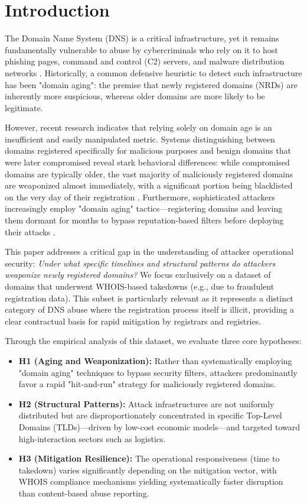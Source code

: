 \documentclass[final, 9pt, twocolumn]{saucis}
\begin{document}
\section{Introduction}

The Domain Name System (DNS) is a critical infrastructure, yet it remains fundamentally vulnerable to abuse by cybercriminals who rely on it to host phishing pages, command and control (C2) servers, and malware distribution networks \cite{dns_abuse_framework}. Historically, a common defensive heuristic to detect such infrastructure has been "domain aging": the premise that newly registered domains (NRDs) are inherently more suspicious, whereas older domains are more likely to be legitimate. 

However, recent research indicates that relying solely on domain age is an insufficient and easily manipulated metric. Systems distinguishing between domains registered specifically for malicious purposes and benign domains that were later compromised reveal stark behavioral differences: while compromised domains are typically older, the vast majority of maliciously registered domains are weaponized almost immediately, with a significant portion being blacklisted on the very day of their registration \cite{comar_aging}. Furthermore, sophisticated attackers increasingly employ "domain aging" tactics—registering domains and leaving them dormant for months to bypass reputation-based filters before deploying their attacks \cite{comar_evasion}. 

This paper addresses a critical gap in the understanding of attacker operational security: \textit{Under what specific timelines and structural patterns do attackers weaponize newly registered domains?} We focus exclusively on a dataset of domains that underwent WHOIS-based takedowns (e.g., due to fraudulent registration data). This subset is particularly relevant as it represents a distinct category of DNS abuse where the registration process itself is illicit, providing a clear contractual basis for rapid mitigation by registrars and registries.

Through the empirical analysis of this dataset, we evaluate three core hypotheses:
\begin{itemize}
    \item \textbf{H1 (Aging and Weaponization):} Rather than systematically employing "domain aging" techniques to bypass security filters, attackers predominantly favor a rapid "hit-and-run" strategy for maliciously registered domains.
    \item \textbf{H2 (Structural Patterns):} Attack infrastructures are not uniformly distributed but are disproportionately concentrated in specific Top-Level Domains (TLDs)—driven by low-cost economic models—and targeted toward high-interaction sectors such as logistics.
    \item \textbf{H3 (Mitigation Resilience):} The operational responsiveness (time to takedown) varies significantly depending on the mitigation vector, with WHOIS compliance mechanisms yielding systematically faster disruption than content-based abuse reporting.
\end{itemize}
\end{document}
